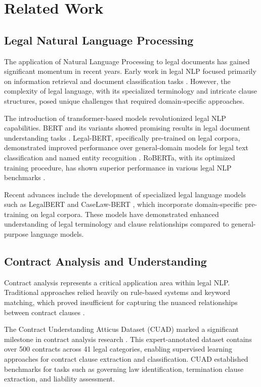 \section{Related Work}

\subsection{Legal Natural Language Processing}

The application of Natural Language Processing to legal documents has gained significant momentum in recent years. Early work in legal NLP focused primarily on information retrieval and document classification tasks \cite{sulea2017predicting}. However, the complexity of legal language, with its specialized terminology and intricate clause structures, posed unique challenges that required domain-specific approaches.

The introduction of transformer-based models revolutionized legal NLP capabilities. BERT and its variants showed promising results in legal document understanding tasks \cite{chalkidis2020legal}. Legal-BERT, specifically pre-trained on legal corpora, demonstrated improved performance over general-domain models for legal text classification and named entity recognition \cite{chalkidis2020legal}. RoBERTa, with its optimized training procedure, has shown superior performance in various legal NLP benchmarks \cite{liu2019roberta}.

Recent advances include the development of specialized legal language models such as LegalBERT \cite{kenton2019bert} and CaseLaw-BERT \cite{chalkidis2020legal}, which incorporate domain-specific pre-training on legal corpora. These models have demonstrated enhanced understanding of legal terminology and clause relationships compared to general-purpose language models.

\subsection{Contract Analysis and Understanding}

Contract analysis represents a critical application area within legal NLP. Traditional approaches relied heavily on rule-based systems and keyword matching, which proved insufficient for capturing the nuanced relationships between contract clauses \cite{manor2019plain}.

The Contract Understanding Atticus Dataset (CUAD) marked a significant milestone in contract analysis research \cite{hendrycks2021cuad}. This expert-annotated dataset contains over 500 contracts across 41 legal categories, enabling supervised learning approaches for contract clause extraction and classification. CUAD established benchmarks for tasks such as governing law identification, termination clause extraction, and liability assessment.


